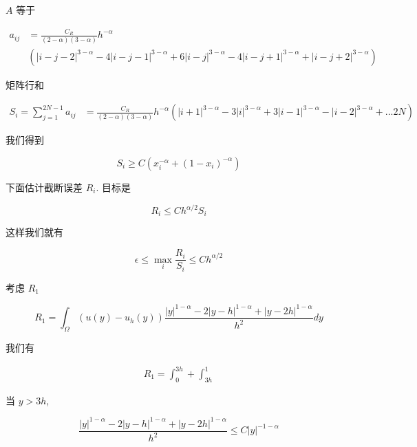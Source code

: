 \documentclass{ctexart}
\begin{document}
\(A\) 等于

\begin{equation}
    \begin{aligned}
    a_{ij} &= \frac{C_R}{(2-\alpha)(3-\alpha)} h^{-\alpha} \\
        & \left( |i-j-2|^{3-\alpha} - 4 |i-j-1|^{3-\alpha} + 6 |i-j|^{3-\alpha} - 4 |i-j+1|^{3-\alpha} +  |i-j+2|^{3-\alpha} \right)
    \end{aligned}
\end{equation}

矩阵行和

\begin{equation}
    \begin{aligned}
        S_i = \sum_{j=1}^{2N-1} a_{ij} & = \frac{C_R}{(2-\alpha)(3-\alpha)} h^{-\alpha} 
            ( |i+1|^{3-\alpha} - 3 |i|^{3-\alpha} + 3 |i-1|^{3-\alpha} - |i-2|^{3-\alpha}  + ... 2N )
    \end{aligned}
\end{equation}


我们得到

\begin{equation}
    S_i \ge  C (x_i^{-\alpha} + (1-x_i)^{-\alpha})
\end{equation}


下面估计截断误差 \(R_i\).
目标是

\begin{equation}
    R_i \le C h^{\alpha/2} S_i
\end{equation}

这样我们就有

\begin{equation}
    \epsilon \le \max_i \frac{R_i}{S_i} \le Ch^{\alpha/2}
\end{equation}

考虑 \(R_1\)

\begin{equation}
    R_1 = \int_\Omega (u(y) - u_h(y)) \frac{ |y|^{1-\alpha} - 2|y-h|^{1-\alpha} + |y-2h|^{1-\alpha} }{h^2} dy
\end{equation}


我们有

\begin{equation}
    \begin{aligned}
        R_1 = \int_0^{3h} + \int_{3h}^{1}
    \end{aligned}
\end{equation}

当 \(y>3h\), 

\begin{equation}
    \frac{ |y|^{1-\alpha} - 2|y-h|^{1-\alpha} + |y-2h|^{1-\alpha} }{h^2} \le C |y|^{-1-\alpha}
\end{equation}
\end{document}

